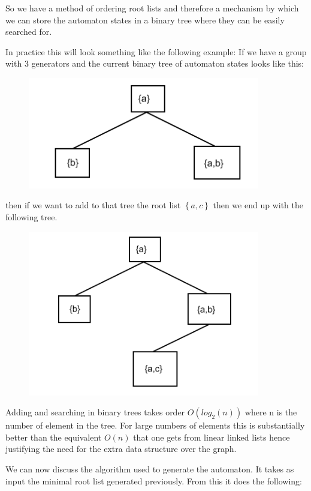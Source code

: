 \documentclass[a4paper,12pt]{article}
\begin{document}
So we have a method of ordering root lists and therefore a mechanism by which we can store the automaton states in a binary tree where they can be easily searched for.

In practice this will look something like the following example:
If we have a group with 3 generators and the current binary tree of automaton states looks like this:
\begin{figure}[H]
	\centering
		\includegraphics[width=101mm]{tree_1.png}
	\label{fig:tree_1}
\end{figure}

then if we want to add to that tree the root list $\left\{a, c\right\}$ then we end up with the following tree.
\begin{figure}[H]
	\centering
		\includegraphics[width=101mm]{tree_2.png}
	\label{fig:tree_2}
\end{figure}

Adding and searching in binary trees takes order $O(log_2(n))$ where n is the number of element in the tree. For large numbers of elements this is substantially better than the equivalent $O(n)$ that one gets from linear linked lists hence justifying the need for the extra data structure over the graph.

We can now discuss the algorithm used to generate the automaton. It takes as input the minimal root list generated previously. From this it does the following:
\end{document}

